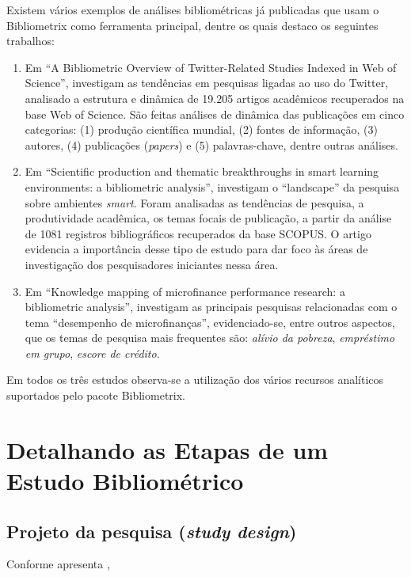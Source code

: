Existem vários exemplos de análises bibliométricas já publicadas que usam o Bibliometrix como ferramenta principal, dentre os quais destaco os seguintes trabalhos:
\begin{enumerate}
    \item Em ``A Bibliometric Overview of Twitter-Related Studies Indexed in Web of Science'', \cite{yu_bibliometric_2020} investigam as tendências em pesquisas ligadas ao uso do Twitter, analisado a estrutura e dinâmica de 19.205 artigos acadêmicos recuperados na base Web of Science. São feitas análises de dinâmica das publicações em cinco categorias: (1) produção científica mundial, (2) fontes de informação, (3) autores, (4) publicações (\textit{papers}) e (5) palavras-chave, dentre outras análises.
    \item Em ``Scientific production and thematic breakthroughs in smart learning environments: a bibliometric analysis'', \cite{agbo_scientific_2021} investigam o ``landscape'' da pesquisa sobre ambientes \textit{smart}. Foram analisadas as tendências de pesquisa, a produtividade acadêmica, os temas focais de publicação, a partir da análise de 1081 registros bibliográficos recuperados da base SCOPUS. O artigo evidencia a importância desse tipo de estudo para dar foco às áreas de investigação dos pesquisadores iniciantes nessa área.
    \item Em ``Knowledge mapping of microfinance performance research: a bibliometric analysis'', \cite{akter_knowledge_2021} investigam as principais pesquisas relacionadas com o tema  ``desempenho de microfinanças'', evidenciado-se, entre outros aspectos, que os temas de pesquisa mais frequentes são: \textit{alívio da pobreza}, \textit{empréstimo em grupo}, \textit{escore de crédito}.
\end{enumerate}

Em todos os três estudos observa-se a utilização dos vários recursos analíticos suportados pelo pacote Bibliometrix.

\section{Detalhando as Etapas de um Estudo Bibliométrico}

\subsection{Projeto da pesquisa (\textit{study design})} 

Conforme apresenta \cite[p. 960]{aria_bibliometrix_2017},


